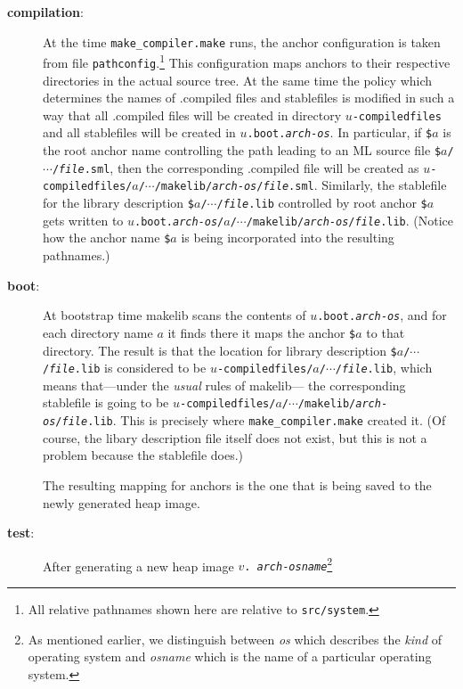 \begin{description}
\item[{\bf compilation}:]
At the time {\tt make_compiler.make} runs, the anchor configuration is taken
from file {\tt pathconfig}.\footnote{All relative pathnames shown here
are relative to {\tt src/system}.}  This configuration maps anchors to
their respective directories in the actual source tree.  At the same
time the policy which determines the names of .compiled files
and stablefiles is modified in such a way that all .compiled files will be
created in directory {\tt $u$-compiledfiles} and all
stablefiles will be created in {\tt $u$.boot.{\it arch}-{\it os}}.
In particular, if {\tt \$$a$} is the root anchor name controlling
the path leading to an ML source file
{\tt \$$a$/$\cdots$/{\it file}.sml},
then the corresponding .compiled file will be created as
{\tt $u$-compiledfiles/$a$/$\cdots$/makelib/{\it arch}-{\it os}/{\it file}.sml}.
Similarly, the stablefile for the library description
{\tt \$$a$/$\cdots$/{\it file}.lib} controlled by root anchor {\tt \$$a$}
gets written to
{\tt $u$.boot.{\it arch}-{\it os}/$a$/$\cdots$/makelib/{\it arch}-{\it os}/{\it file}.lib}.
(Notice how the anchor name {\tt \$$a$} is being incorporated into the
resulting pathnames.)
\item[{\bf boot}:]
At bootstrap time makelib
scans the contents of {\tt $u$.boot.{\it arch}-{\it os}}, and for
each directory name $a$ it finds there it maps the anchor {\tt \$$a$} to that
directory.  The result is that the location for library description
{\tt \$$a$/$\cdots$/{\it file}.lib}
is considered to be
{\tt $u$-compiledfiles/$a$/$\cdots$/{\it file}.lib}, which
means that---under the {\em usual} rules of makelib---
the corresponding stablefile is going to be
{\tt $u$-compiledfiles/$a$/$\cdots$/makelib/{\it arch}-{\it
os}/{\it file}.lib}.  This is precisely where {\tt make_compiler.make} created
it.  (Of course, the libary description file itself does not exist,
but this is not a problem because the stablefile does.)

The resulting mapping for anchors is the one that is being saved to the
newly generated heap image.
\item[{\bf test}:] After generating a new heap image {\tt $v$.{\it
arch}-{\it osname}}\footnote{As mentioned earlier, we distinguish
between {\it os} which describes the {\em kind} of operating system
and {\it osname} which is the name of a particular operating system.

}
\end{description}
